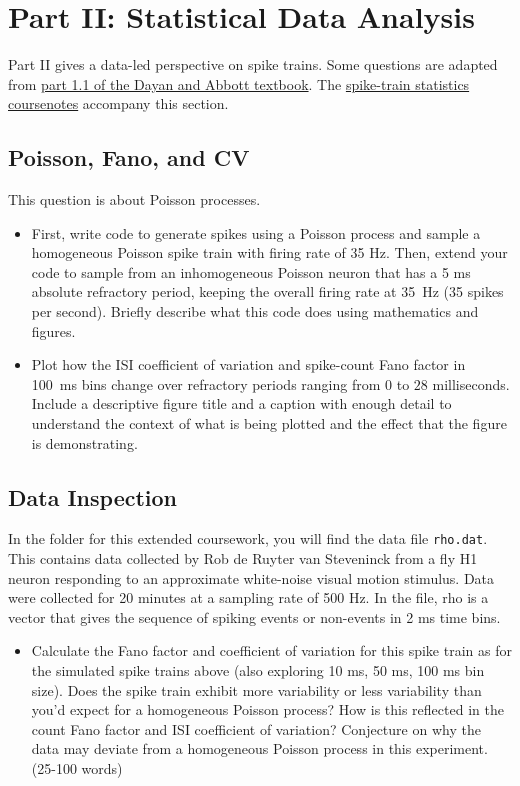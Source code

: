 \documentclass[11pt]{article}
\begin{document}
\clearpage
\section*{Part II: Statistical Data Analysis}
Part II gives a data-led perspective on spike trains. Some questions are adapted from \href{http://www.gatsby.ucl.ac.uk/\~dayan/book/exercises.html}{part 1.1 of the Dayan and Abbott textbook}.
The \href{https://github.com/engmaths/SEMT30003_2025/blob/main/Reading/Coursenotes/08.1_spike_train_statistics}{spike-train statistics coursenotes} accompany this section. 

\subsection{Poisson, Fano, and CV ~ \normalfont [5 marks]}
This question is about Poisson processes.
\begin{itemize}
\item[\textbf{(i)}]
First, write code to generate spikes using a Poisson process and sample a homogeneous Poisson spike train with firing rate of 35 Hz. Then, extend your code to sample from an inhomogeneous Poisson neuron that has a 5 ms absolute refractory period, keeping the overall firing rate at 35~Hz (35 spikes per second). Briefly describe what this code does using mathematics and figures.
\item[\textbf{(ii)}]
Plot how the ISI coefficient of variation and spike-count Fano factor in 100~ms bins change over refractory periods ranging from $0$ to $28$ milliseconds. Include a descriptive figure title and a caption with enough detail to understand the context of what is being plotted and the effect that the figure is demonstrating.
\end{itemize}

\subsection{Data Inspection~ \normalfont [5 marks]}
In the folder for this extended coursework, you will find the data file \texttt{rho.dat}. This contains data collected by Rob de Ruyter van Steveninck from a fly H1 neuron responding to an approximate white-noise visual motion stimulus. Data were collected for 20 minutes at a sampling rate of 500 Hz. In the file, rho is a vector that gives the sequence of spiking events or non-events in 2 ms time bins.
\begin{itemize}
\item[\textbf{(i)}]
Calculate the Fano factor and coefficient of variation for this spike train as for the simulated spike trains above (also exploring 10 ms, 50 ms, 100 ms bin size). Does the spike train exhibit more variability or less variability than you'd expect for a homogeneous Poisson process? How is this reflected in the count Fano factor and ISI coefficient of variation? Conjecture on why the data may deviate from a homogeneous Poisson process in this experiment. (25-100 words)
\end{itemize}
\end{document}
